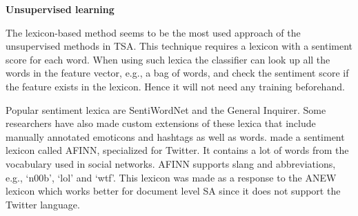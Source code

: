\noindent
\textbf{Unsupervised learning} \\
\noindent 

The lexicon-based method seems to be the most used approach of the unsupervised methods in TSA. This technique requires a lexicon with a sentiment score for each word. When using such lexica the classifier can look up all the words in the feature vector, e.g., a bag of words, and check the sentiment score if the feature exists in the lexicon. Hence it will not need any training beforehand.
	
Popular sentiment lexica are SentiWordNet and the General Inquirer. Some researchers have also made custom extensions of these lexica that include manually annotated emoticons and hashtags as well as words. \cite{article:afinn} made a sentiment lexicon called AFINN, specialized for Twitter. It contains a lot of words from the vocabulary used in social networks. AFINN supports slang and abbreviations, e.g., ‘n00b’, ‘lol’ and ‘wtf’. This lexicon was made as a response to the ANEW lexicon which works better for document level SA since it does not support the Twitter language.